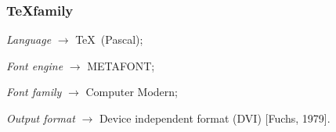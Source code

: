 \documentclass{beamer}
\begin{document}
\begin{frame}
  \frametitle{\TeX family}
   \begin{list}
      {\color{blue!90!bg}{$\star$}}{\setlength{\parsep}{.5cm}}
    \item {\em Language} $\rightarrow$ \TeX~(Pascal);
    \item {\em Font engine} $\rightarrow$ METAFONT;
    \item {\em Font family} $\rightarrow$ Computer Modern;
    \item {\em Output format} $\rightarrow$ Device independent format (DVI) [Fuchs, 1979].
   \end{list}
\end{frame}

\def\xptex{2.5} %
\def\xshift{3} %
\end{document}

